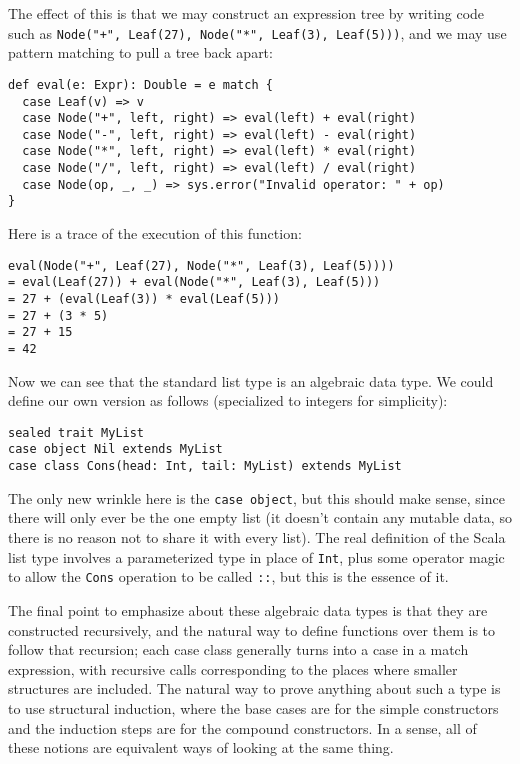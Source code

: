 \documentclass[11pt]{article}
\begin{document}
The effect of this is that we may construct an expression tree by writing code such as \texttt{Node("+", Leaf(27), Node("*", Leaf(3), Leaf(5)))}, and we may use pattern matching to pull a tree back apart:
\begin{verbatim}
def eval(e: Expr): Double = e match {
  case Leaf(v) => v
  case Node("+", left, right) => eval(left) + eval(right)
  case Node("-", left, right) => eval(left) - eval(right)
  case Node("*", left, right) => eval(left) * eval(right)
  case Node("/", left, right) => eval(left) / eval(right)
  case Node(op, _, _) => sys.error("Invalid operator: " + op)
}
\end{verbatim}
Here is a trace of the execution of this function:
\begin{verbatim}
eval(Node("+", Leaf(27), Node("*", Leaf(3), Leaf(5))))
= eval(Leaf(27)) + eval(Node("*", Leaf(3), Leaf(5)))
= 27 + (eval(Leaf(3)) * eval(Leaf(5)))
= 27 + (3 * 5)
= 27 + 15
= 42
\end{verbatim}

Now we can see that the standard list type is an algebraic data type. We could define our own version as follows (specialized to integers for simplicity):
\begin{verbatim}
sealed trait MyList
case object Nil extends MyList
case class Cons(head: Int, tail: MyList) extends MyList
\end{verbatim}
The only new wrinkle here is the \texttt{case object}, but this should make sense, since there will only ever be the one empty list (it doesn't contain any mutable data, so there is no reason not to share it with every list). The real definition of the Scala list type involves a parameterized type in place of \texttt{Int}, plus some operator magic to allow the \texttt{Cons} operation to be called \texttt{::}, but this is the essence of it.

The final point to emphasize about these algebraic data types is that they are constructed recursively, and the natural way to define functions over them is to follow that recursion; each case class generally turns into a case in a match expression, with recursive calls corresponding to the places where smaller structures are included. The natural way to prove anything about such a type is to use structural induction, where the base cases are for the simple constructors and the induction steps are for the compound constructors. In a sense, all of these notions are equivalent ways of looking at the same thing.
\end{document}
